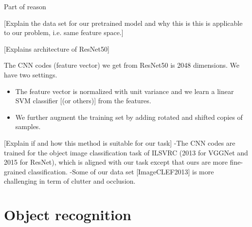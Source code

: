 \documentclass[journal, 10pt]{IEEEtran}
\begin{document}
Part of reason

[Explain the data set for our pretrained model and why this is this is applicable to our problem, i.e. same feature space.]

[Explains architecture of ResNet50]

The CNN codes (feature vector) we get from ResNet50 is 2048 dimensions.
We have two settings.
\begin{itemize}
  \item [--] [explain preprocessing] The feature vector is normalized with unit variance and we learn a linear SVM classifier [(or others)] from the features.
  \item [--] We further augment the training set by adding rotated and shifted copies of samples.
\end{itemize}

[Explain if and how this method is suitable for our task]
-The CNN codes are trained for the object image classification task of ILSVRC (2013 for VGGNet and 2015 for ResNet), which is aligned with our task except that ours are more fine-grained classification.
-Some of our data set [ImageCLEF2013] is more challenging in term of clutter and occlusion.


\section{Object recognition}
\end{document}
